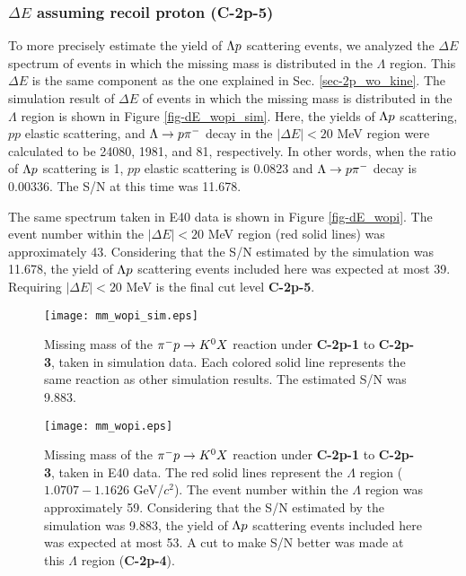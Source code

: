 \subsubsection{$\Delta E$ assuming recoil proton ({\bf C-2p-5})}

To more precisely estimate the yield of $\Lambda p$ scattering events, we analyzed the $\Delta E$ spectrum of events in which the missing mass is distributed in the $\Lambda$ region.
This $\Delta E$ is the same component as the one explained in Sec. \ref{sec-2p_wo_kine}.
The simulation result of $\Delta E$ of events in which the missing mass is distributed in the $\Lambda$ region is shown in Figure \ref{fig-dE_wopi_sim}. Here, the yields of $\Lambda p$ scattering, $pp$ elastic scattering, and $\Lambda\to p\pi^{-}$ decay in the $|\Delta E|<20$ MeV region were calculated to be 24080, 1981, and 81, respectively. In other words, when the ratio of $\Lambda p$ scattering is 1, $pp$ elastic scattering is 0.0823 and $\Lambda\to p\pi^{-}$ decay is 0.00336. The S/N at this time was 11.678.

The same spectrum taken in E40 data is shown in Figure \ref{fig-dE_wopi}. The event number within the $|\Delta E|<20$ MeV region (red solid lines) was approximately 43. Considering that the S/N estimated by the simulation was 11.678, the yield of $\Lambda p$ scattering events included here was expected at most 39. Requiring $|\Delta E|<20$ MeV is the final cut level {\bf C-2p-5}.

\begin{figure}[!h]
  \begin{center}
    \texttt{[image: mm\_wopi\_sim.eps]}
    \caption{Missing mass of the $\pi^- p \to K^0 X$ reaction under {\bf C-2p-1} to {\bf C-2p-3}, taken in simulation data. Each colored solid line represents the same reaction as other simulation results. The estimated S/N was 9.883.}
    \label{fig-mm_wopi_sim}
  \end{center}
\end{figure}

\begin{figure}[!h]
  \begin{center}
    \texttt{[image: mm\_wopi.eps]}
    \caption{Missing mass of the $\pi^- p \to K^0 X$ reaction under {\bf C-2p-1} to {\bf C-2p-3}, taken in E40 data. The red solid lines represent the $\Lambda$ region ($1.0707-1.1626$ GeV/$c^{2}$). The event number within the $\Lambda$ region was approximately 59. Considering that the S/N estimated by the simulation was 9.883, the yield of $\Lambda p$ scattering events included here was expected at most 53. A cut to make S/N better was made at this $\Lambda$ region ({\bf C-2p-4}).}
    \label{fig-mm_wopi}
  \end{center}
\end{figure}

